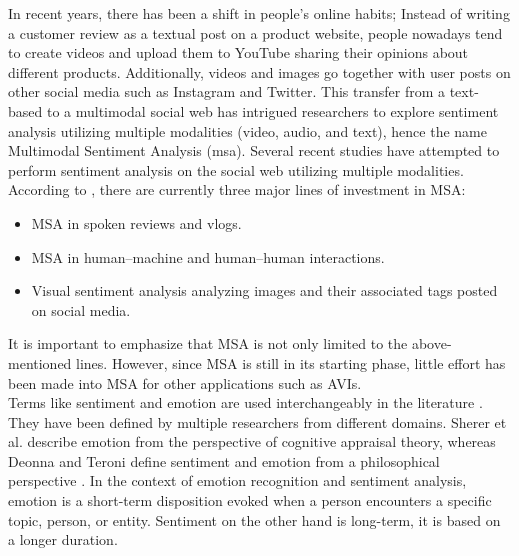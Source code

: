In recent years, there has been a shift in people's online habits; Instead of writing a customer review as a textual post on a product website, people nowadays tend to create videos and upload them to YouTube sharing their opinions about different products. Additionally, videos and images go together with user posts on other social media such as Instagram and Twitter. This transfer from a text-based to a multimodal social web has intrigued researchers to explore sentiment analysis utilizing multiple modalities (video, audio, and text), hence the name Multimodal Sentiment Analysis (\acrshort{msa}). Several recent studies have attempted to perform sentiment analysis on the social web utilizing multiple modalities. According to \cite{MSA_review1_SOLEYMANI20173}, there are currently three major lines of investment in MSA: 
%
\begin{itemize}
    \item MSA in spoken reviews and vlogs. \\
    \item MSA in human–machine and human–human interactions. \\
    \item Visual sentiment analysis analyzing images and their associated tags posted on social media.
\end{itemize}
%
\indent It is important to emphasize that MSA is not only limited to the above-mentioned lines. However, since MSA is still in its starting phase, little effort has been made into MSA for other applications such as AVIs. \\

Terms like sentiment and emotion are used interchangeably in the literature \cite{sentiment_emotion_difference_munezero2014they} \cite{HP_RPP} \cite{HP_Advanced}. They have been defined by multiple researchers from different domains. Sherer et al. \cite{scherer2005emotions} describe emotion from the perspective of cognitive appraisal theory, whereas Deonna and Teroni \cite{deonna2012emotions} define sentiment and emotion from a philosophical perspective \cite{MSA_review1_SOLEYMANI20173}. In the context of emotion recognition and sentiment analysis, emotion is a short-term disposition evoked when a person encounters a specific topic, person, or entity. Sentiment on the other hand is long-term, it is based on a longer duration.  \\

